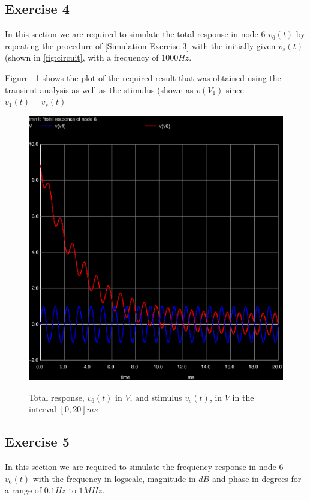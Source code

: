 \subsection{Exercise 4}
\label{Simulation Exercise 4}
In this section we are required to simulate the total response in node 6 $v_{6}(t)$ by repeating the procedure of \ref{Simulation Exercise 3} with the initially given $v_s(t)$ (shown in \ref{fig:circuit}, with a frequency of $1000 Hz$.

Figure ~\ref{fig:simulation_4} shows the plot of the required result that was obtained using the transient analysis as well as the stimulus (shown as $v(V_1)$ since $v_1(t) = v_s(t)$

\begin{figure}[!ht] \centering
\caption{Total response, $v_{6}(t)$ in $V$, and stimulus $v_s(t)$, in $V$ in the interval $[0,20]ms$}
\includegraphics[width=0.8\linewidth]{trans4.eps}
\label{fig:simulation_4}
\end{figure}


\newpage
\subsection{Exercise 5}
\label{Simulation Exercise 5}
In this section we are required to simulate the frequency response in node 6 $v_{6}(t)$ with the frequency in logscale, magnitude in $dB$ and phase in degrees for a range of $0.1Hz$ to $1MHz$.

